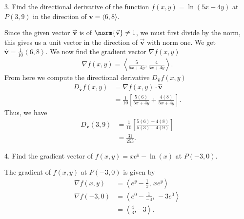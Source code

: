 \documentclass{report}
\begin{document}
    \pagebreak 
    \begin{mdframed}
        3. Find the directional derivative of the function $f(x, y) = \ln(5x + 4y)$ at $P(3, 9)$ in the direction of $\mathbf{v} = \langle 6, 8 \rangle$.
    \end{mdframed}
    \bigbreak \noindent 
    Since the given vector $\vec{\mathbf{v}}$ is of $\norm{\vec{\mathbf{v}}} \neq 1$, we must first divide by the norm, this gives us a unit vector in the direction of $\vec{\mathbf{v}}$ with norm one. We get $\hat{\mathbf{v}} = \frac{1}{10}\left\langle 6,8 \right\rangle $. We now find the gradient vector $\nabla f(x,y)$
    \begin{align*}
        \nabla f(x,y) = \left\langle \frac{5}{5x+4y} , \frac{4}{5x+4y} \right\rangle
    .\end{align*}
    \bigbreak \noindent 
    From here we compute the directional derivative $D_{\hat{\mathbf{v}}} f(x,y)$
    \begin{align*}
        D_{\hat{\mathbf{v}}}f(x,y) &= \nabla f(x,y) \cdot \hat{\mathbf{v}} \\
                                   &=\frac{1}{10}\left[\frac{5(6)}{5x+4y} + \frac{4(8)}{5x+4y}\right]
    .\end{align*}
    Thus, we have
    \begin{align*}
        D_{\hat{\mathbf{v}}}(3,9) &= \frac{1}{10}\left[\frac{5(6) + 4(8)}{5(3) + 4(9)}\right] \\
        &=\frac{31}{255}
    .\end{align*}
    
    \bigbreak \noindent 
    \begin{mdframed}
        4. Find the gradient vector of $f(x, y) = xe^{y} - \ln(x)$ at $P(-3, 0)$.
    \end{mdframed}
    \bigbreak \noindent 
    The gradient of $f(x,y)$ at $P(-3,0)$ is given by
    \begin{align*}
        \nabla f(x,y) &= \left\langle e^{y} - \frac{1}{x}, \, xe^{y} \right\rangle \\
        \nabla f(-3,0) &= \left\langle e^{0} - \frac{1}{-3}, \, -3e^{0} \right\rangle \\
                       &= \left\langle \frac{4}{3}, -3 \right\rangle
    .\end{align*}
\end{document}
